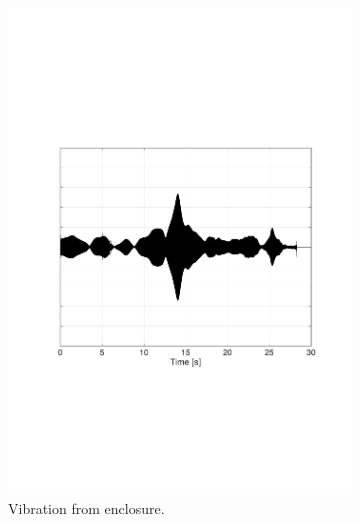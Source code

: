\begin{figure}[H]
\begin{subfigure}[t]{0.3\textwidth}
	\includegraphics[width=1\textwidth]{figures/raw_enclosure20.pdf}
	\caption{Vibration from enclosure.}
	\label{fig:raw_enclosure20}
\end{subfigure}
\begin{subfigure}[t]{0.3\textwidth}

\end{subfigure}
\end{figure}
